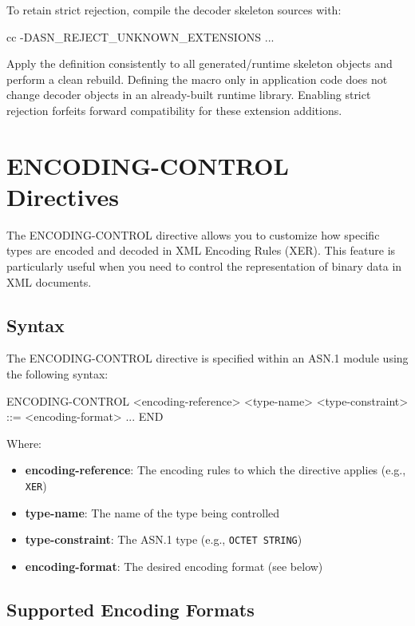 \documentclass[english,oneside,12pt]{book}
\begin{document}
To retain strict rejection, compile the decoder skeleton sources with:

\begin{bash}
cc -DASN_REJECT_UNKNOWN_EXTENSIONS ...
\end{bash}

Apply the definition consistently to all generated/runtime skeleton objects and
perform a clean rebuild. Defining the macro only in application code does not
change decoder objects in an already-built runtime library. Enabling strict
rejection forfeits forward compatibility for these extension additions.

\section{\label{sec:ENCODING-CONTROL}ENCODING-CONTROL Directives}

The ENCODING-CONTROL directive allows you to customize how specific types are encoded 
and decoded in XML Encoding Rules (XER). This feature is particularly useful when you 
need to control the representation of binary data in XML documents.

\subsection*{Syntax}

The ENCODING-CONTROL directive is specified within an ASN.1 module using the following syntax:

\begin{asn}
ENCODING-CONTROL <encoding-reference>
    <type-name> <type-constraint> ::= <encoding-format>
    ...
END
\end{asn}

Where:
\begin{itemize}
\item \textbf{encoding-reference}: The encoding rules to which the directive applies (e.g., \texttt{XER})
\item \textbf{type-name}: The name of the type being controlled
\item \textbf{type-constraint}: The ASN.1 type (e.g., \texttt{OCTET STRING})
\item \textbf{encoding-format}: The desired encoding format (see below)
\end{itemize}

\subsection*{Supported Encoding Formats}
\end{document}
